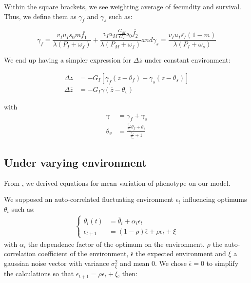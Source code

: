Within the square brackets, we see weighting average of fecundity and survival. Thus, we define them as $\gamma_{f}$ and $\gamma_{s}$ such as:

\begin{subequations}
	\begin{equation}
	\label{eq:gammaf}
	\gamma_{f} = \frac{v_{I} u_{I} s_{0} m \overline{f_{1}} }{\lambda(P_{I}+\omega_{f})} + \frac{ v_{I} u_{M} \frac{G_{M}}{G_{I}} s_{0} \overline{f_{2}}}{\lambda ( P_{M} + \omega_{f} )}
	\end{equation}
	and
	\begin{equation}
	\label{eq:gammas}
	\gamma_{s} = \frac{ v_{I} u_{I} \overline{s_{I}} (1-m) }{\lambda(P_{I}+\omega_{s})}
	\end{equation}
\end{subequations}

We end up having a simpler expression for $\Delta\overline{z}$ under constant environment:

\begin{align}
	\Delta\overline{z} &= -G_{I} \left[ \gamma_{f}(\overline{z} - \theta_{f}) + \gamma_{s}(\overline{z} - \theta_{s}) \right] \nonumber \\
	\Delta\overline{z} &= - G_{I} \gamma(\overline{z} - \theta_{v})
\end{align}

with
\begin{align}
	\gamma &= \gamma_{f} + \gamma_{s} \\
	\theta_{v} &= \frac{\frac{\gamma_{f}}{\gamma_{s}}\theta_{f} + \theta_{s}}{\frac{\gamma_{f}}{\gamma_{s}} + 1}
\end{align}

\subsection*{Under varying environment}
From \citet{engen_evolution_2011}, we derived equations for mean variation of phenotype on our model.

We supposed an auto-correlated fluctuating environment $\epsilon_{t}$ influencing optimums $\theta_{i}$ such as:
\begin{align}
	\label{eq:epstheta}
\left\{
	\begin{aligned}
		\theta_{i}(t) &= \overline{\theta}_{i} + \alpha_{i}\epsilon_{t}\\
		\epsilon_{t+1} &= (1-\rho)\overline{\epsilon} + \rho\epsilon_{t} + \xi
	\end{aligned}
\right.
\end{align}
with $\alpha_{i}$ the dependence factor of the optimum on the environment, $\rho$ the auto-correlation coefficient of the environment, $\overline{\epsilon}$ the expected environment and $\xi$ a gaussian noise vector with variance $\sigma^{2}_{\xi}$ and mean $0$. We chose $\overline{\epsilon}=0$ to simplify the calculations so that $\epsilon_{t+1} = \rho\epsilon_{t} + \xi$, then:

